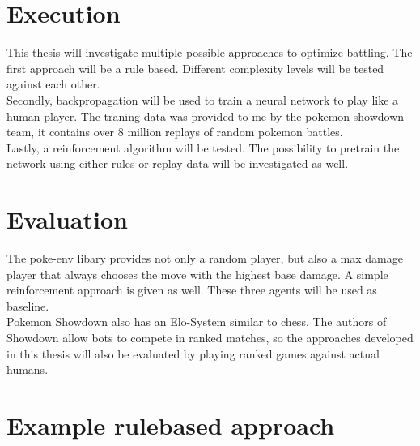 \documentclass{article}
\begin{document}
\section{Execution}
This thesis will investigate multiple possible approaches to optimize battling.
The first approach will be a rule based. Different complexity levels will be
tested against each other. \\
Secondly, backpropagation will be used to train a neural network to play
like a human player. The traning data was provided to me by the pokemon
showdown team, it contains over 8 million replays of random pokemon battles. \\
Lastly, a reinforcement algorithm will be tested. The possibility to pretrain
the network using either rules or replay data will be investigated as well.

\section{Evaluation}
The poke-env libary provides not only a random player, but also a max damage player
that always chooses the move with the highest base damage. A simple reinforcement
approach is given as well. These three agents will be used as baseline. \\
Pokemon Showdown also has an Elo-System similar to chess. The authors of 
Showdown allow bots to compete in ranked matches, so the approaches
developed in this thesis will also be evaluated by playing ranked games 
against actual humans.

\section{Example rulebased approach}
\end{document}
